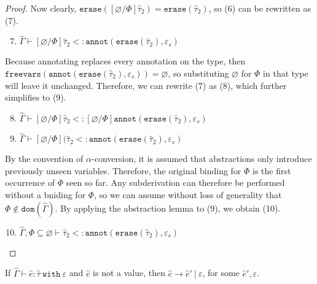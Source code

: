\documentclass{llncs}
\newcommand{\keywadj}[1]{\mathtt{#1}}
\newcommand{\keyw}[1]{\keywadj{#1}~}
\newcommand{\kw}[1]{\keyw{ #1 }}
\newcommand{\kwa}[1]{\keywadj{ #1 }}
\newcommand{\annot}[2]{
	\keywadj{annot}(#1, #2)
}
\newcommand{\erase}[1]{
	\keywadj{erase}(#1)
}
\begin{document}
\begin{proof}
Now clearly, $\erase{[\varnothing/\Phi]\hat \tau_2} = \erase{\hat \tau_2}$, so (6) can be rewritten as (7). 

\begin{enumerate}
	\setcounter{enumi}{6}
	\item $\hat \Gamma \vdash [\varnothing/\Phi]\hat \tau_2 <: \annot{\erase{\hat \tau_2}}{\varepsilon_s}$
\end{enumerate}

Because annotating replaces every annotation on the type, then $\kwa{freevars}(\annot{\erase{\hat \tau_2}}{\varepsilon_s}) = \varnothing$, so substituting $\varnothing$ for $\Phi$ in that type will leave it unchanged. Therefore, we can rewrite (7) as (8), which further simplifies to (9).

\begin{enumerate}
	\setcounter{enumi}{7}
	\item $\hat \Gamma \vdash [\varnothing/\Phi]\hat \tau_2 <: [\varnothing/\Phi]\annot{\erase{\hat \tau_2}}{\varepsilon_s}$
	\item $\hat \Gamma \vdash [\varnothing/\Phi](\hat \tau_2 <: \annot{\erase{\hat \tau_2}}{\varepsilon_s}$
\end{enumerate}

By the convention of $\alpha$-conversion, it is assumed that abstractions only introduce previously unseen variables. Therefore, the original binding for $\Phi$ is the first occurrence of $\Phi$ seen so far. Any subderivation can therefore be performed without a bniding for $\Phi$, so we can assume without loss of generality that $\Phi \notin \kwa{dom}(\hat \Gamma)$. By applying the abstraction lemma to (9), we obtain (10).

\begin{enumerate}
	\setcounter{enumi}{9}
	\item $\hat \Gamma, \Phi \subseteq \varnothing \vdash \hat \tau_2 <: \annot{\erase{\hat \tau_2}}{\varepsilon_s}$
\end{enumerate}

\end{proof}

\hrulefill


\begin{theorem}[Progress]
If $\hat \Gamma \vdash \hat e: \hat \tau~\kw{with} \varepsilon$ and $\hat e$ is not a value, then $\hat e \longrightarrow \hat e'~|~\varepsilon$, for some $\hat e', \varepsilon$.
\end{theorem}
\end{document}
